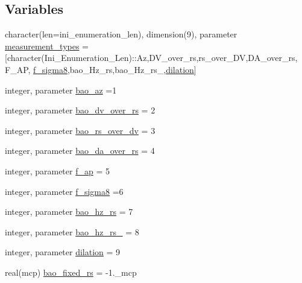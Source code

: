 \subsection*{Variables}
\begin{DoxyCompactItemize}
\item 
character(len=ini\+\_\+enumeration\+\_\+len), dimension(9), parameter \mbox{\hyperlink{namespacebao_a5a7cbf786aa65368c32203dfb9b72991}{measurement\+\_\+types}} = \mbox{[}character(Ini\+\_\+\+Enumeration\+\_\+\+Len)\+::\textquotesingle{}Az\textquotesingle{},\textquotesingle{}D\+V\+\_\+over\+\_\+rs\textquotesingle{},\textquotesingle{}rs\+\_\+over\+\_\+\+DV\textquotesingle{},\textquotesingle{}D\+A\+\_\+over\+\_\+rs\textquotesingle{}, \textquotesingle{}F\+\_\+\+AP\textquotesingle{}, \textquotesingle{}\mbox{\hyperlink{namespacebao_aaa65837538ed00f6c87276b81b451c45}{f\+\_\+sigma8}}\textquotesingle{},\textquotesingle{}bao\+\_\+\+Hz\+\_\+rs\textquotesingle{},\textquotesingle{}bao\+\_\+\+Hz\+\_\+rs\+\_\textquotesingle{},\textquotesingle{}\mbox{\hyperlink{namespacebao_a9bc55477c817a8204a8dd45a73ab6faa}{dilation}}\textquotesingle{}\mbox{]}
\item 
integer, parameter \mbox{\hyperlink{namespacebao_ab53a2d435899a21c918a07f7243d2a9f}{bao\+\_\+az}} =1
\item 
integer, parameter \mbox{\hyperlink{namespacebao_a0524be8a1cd6362d8c5e0cc628384991}{bao\+\_\+dv\+\_\+over\+\_\+rs}} = 2
\item 
integer, parameter \mbox{\hyperlink{namespacebao_aadd8d344c5506828f10eed295270faf7}{bao\+\_\+rs\+\_\+over\+\_\+dv}} = 3
\item 
integer, parameter \mbox{\hyperlink{namespacebao_a5856a51527a41fd49a3222f83de0f1da}{bao\+\_\+da\+\_\+over\+\_\+rs}} = 4
\item 
integer, parameter \mbox{\hyperlink{namespacebao_a90e9d6d857982260b5025f4778bf0a4d}{f\+\_\+ap}} = 5
\item 
integer, parameter \mbox{\hyperlink{namespacebao_aaa65837538ed00f6c87276b81b451c45}{f\+\_\+sigma8}} =6
\item 
integer, parameter \mbox{\hyperlink{namespacebao_a5d192049c79a222547036308959868c2}{bao\+\_\+hz\+\_\+rs}} = 7
\item 
integer, parameter \mbox{\hyperlink{namespacebao_aad05aa1882f8f917547a2919bb25db43}{bao\+\_\+hz\+\_\+rs\+\_}} = 8
\item 
integer, parameter \mbox{\hyperlink{namespacebao_a9bc55477c817a8204a8dd45a73ab6faa}{dilation}} = 9
\item 
real(mcp) \mbox{\hyperlink{namespacebao_a4f0a92dc313e31a91e5edb5e2ef09fec}{bao\+\_\+fixed\+\_\+rs}} = -\/1.\+\_\+mcp
\end{DoxyCompactItemize}


